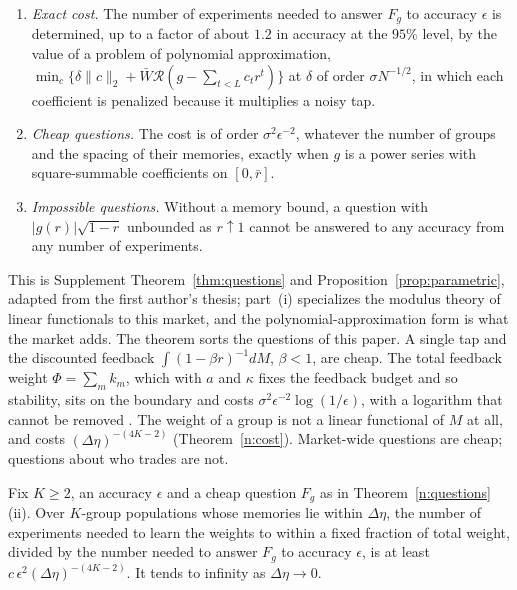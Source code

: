 \begin{theorem}\label{n:questions}
\begin{enumerate}[label=(\roman*),itemsep=1pt]
\item \emph{Exact cost.} The number of experiments needed to answer $F_g$ to accuracy $\epsilon$ is determined, up to a factor of about $1.2$ in accuracy at the $95\%$ level, by the value of a problem of polynomial approximation, $\min_c\{\delta\|c\|_2+\bar W\mathcal R(g-\sum_{t<L}c_tr^t)\}$ at $\delta$ of order $\sigma N^{-1/2}$, in which each coefficient is penalized because it multiplies a noisy tap.
\item \emph{Cheap questions.} The cost is of order $\sigma^2\epsilon^{-2}$, whatever the number of groups and the spacing of their memories, exactly when $g$ is a power series with square-summable coefficients on $[0,\bar r]$.
\item \emph{Impossible questions.} Without a memory bound, a question with $|g(r)|\sqrt{1-r}$ unbounded as $r\uparrow1$ cannot be answered to any accuracy from any number of experiments.
\end{enumerate}
\end{theorem}

This is Supplement Theorem~\ref{thm:questions} and Proposition~\ref{prop:parametric}, adapted from the first author's thesis; part~(i) specializes the modulus theory of linear functionals \citep{donoho1994} to this market, and the polynomial-approximation form is what the market adds. The theorem sorts the questions of this paper. A single tap and the discounted feedback $\int(1-\beta r)^{-1}dM$, $\beta<1$, are cheap. The total feedback weight $\Phi=\sum_mk_m$, which with $a$ and $\kappa$ fixes the feedback budget and so stability, sits on the boundary and costs $\sigma^2\epsilon^{-2}\log(1/\epsilon)$, with a logarithm that cannot be removed \citep{niroula2026b}. The weight of a group is not a linear functional of $M$ at all, and costs $(\Delta\eta)^{-(4K-2)}$ (Theorem~\ref{n:cost}). Market-wide questions are cheap; questions about who trades are not.

\begin{corollary}\label{n:sep}
Fix $K\ge2$, an accuracy $\epsilon$ and a cheap question $F_g$ as in Theorem~\ref{n:questions}(ii). Over $K$-group populations whose memories lie within $\Delta\eta$, the number of experiments needed to learn the weights to within a fixed fraction of total weight, divided by the number needed to answer $F_g$ to accuracy $\epsilon$, is at least $c\,\epsilon^2(\Delta\eta)^{-(4K-2)}$. It tends to infinity as $\Delta\eta\to0$.
\end{corollary}

